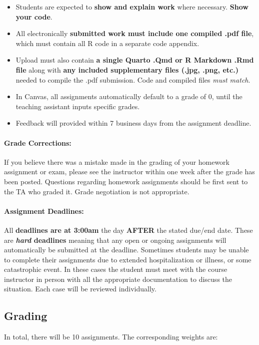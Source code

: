 \documentclass[11pt]{article}
\begin{document}
	
\begin{itemize}
	\item Students are expected to \textbf{show and explain work} where necessary. \textbf{Show your code}.
	\item All electronically \textbf{submitted work must include one compiled .pdf file}, which must contain all R code in a separate code appendix.
	\item Upload must also contain \textbf{a single Quarto .Qmd or R Markdown .Rmd file} along with \textbf{any included supplementary files (.jpg, .png, etc.)} needed to compile the .pdf submission. Code and compiled files \emph{must match}.
	\item In Canvas, all assignments automatically default to a grade of 0, until the teaching assistant inputs specific grades.
	\item Feedback will provided within 7 business days from the assignment deadline.
\end{itemize}
	
\paragraph{Grade Corrections:}
If you believe there was a mistake made in the grading of your homework assignment or exam, please see the instructor within one week after the grade has been posted. Questions regarding homework assignments should be first sent to the TA who graded it. Grade negotiation is not appropriate.
	
\paragraph{Assignment Deadlines:}
All \textbf{deadlines are at 3:00am} the day \textbf{AFTER} the stated due/end date.  These are \textbf{\emph{hard} deadlines} meaning that any open or ongoing assignments will automatically be submitted at the deadline. Sometimes students may be unable to complete their assignments due to extended hospitalization or illness, or some catastrophic event. In these cases the student must meet with the course instructor in person with all the appropriate documentation to discuss the situation. Each case will be reviewed individually. 

\pagebreak

\subsection*{Grading}
In total, there will be 10 assignments.  The corresponding weights are: 
\end{document}
